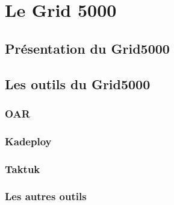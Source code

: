 \part{Le Grid 5000}
\chapter{Présentation du Grid5000}


\chapter{Les outils du Grid5000}
\section{OAR}
\section{Kadeploy}
\section{Taktuk}
\section{Les autres outils}
